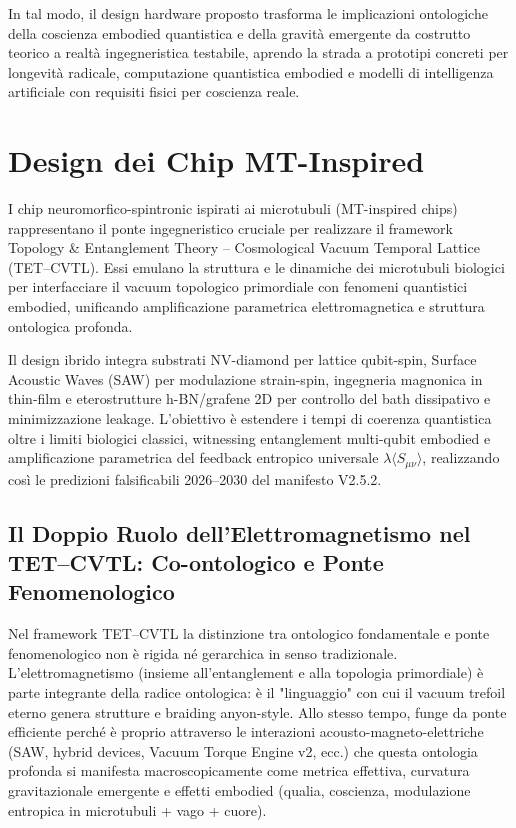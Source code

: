 \documentclass[12pt,a4paper]{article}
\begin{document}
In tal modo, il design hardware proposto trasforma le implicazioni ontologiche della coscienza embodied quantistica e della gravità emergente da costrutto teorico a realtà ingegneristica testabile, aprendo la strada a prototipi concreti per longevità radicale, computazione quantistica embodied e modelli di intelligenza artificiale con requisiti fisici per coscienza reale.


\section{Design dei Chip MT-Inspired}

I chip neuromorfico-spintronic ispirati ai microtubuli (MT-inspired chips) rappresentano il ponte ingegneristico cruciale per realizzare il framework Topology \& Entanglement Theory -- Cosmological Vacuum Temporal Lattice (TET--CVTL). Essi emulano la struttura e le dinamiche dei microtubuli biologici per interfacciare il vacuum topologico primordiale con fenomeni quantistici embodied, unificando amplificazione parametrica elettromagnetica e struttura ontologica profonda.

Il design ibrido integra substrati NV-diamond per lattice qubit-spin, Surface Acoustic Waves (SAW) per modulazione strain-spin, ingegneria magnonica in thin-film e eterostrutture h-BN/grafene 2D per controllo del bath dissipativo e minimizzazione leakage. L'obiettivo è estendere i tempi di coerenza quantistica oltre i limiti biologici classici, witnessing entanglement multi-qubit embodied e amplificazione parametrica del feedback entropico universale $\lambda \langle S_{\mu\nu} \rangle$, realizzando così le predizioni falsificabili 2026--2030 del manifesto V2.5.2.


\subsection{Il Doppio Ruolo dell'Elettromagnetismo nel TET--CVTL: Co-ontologico e Ponte Fenomenologico}

Nel framework TET--CVTL la distinzione tra ontologico fondamentale e ponte fenomenologico non è rigida né gerarchica in senso tradizionale. L'elettromagnetismo (insieme all'entanglement e alla topologia primordiale) è parte integrante della radice ontologica: è il "linguaggio" con cui il vacuum trefoil eterno genera strutture e braiding anyon-style. Allo stesso tempo, funge da ponte efficiente perché è proprio attraverso le interazioni acousto-magneto-elettriche (SAW, hybrid devices, Vacuum Torque Engine v2, ecc.) che questa ontologia profonda si manifesta macroscopicamente come metrica effettiva, curvatura gravitazionale emergente e effetti embodied (qualia, coscienza, modulazione entropica in microtubuli + vago + cuore).
\end{document}
